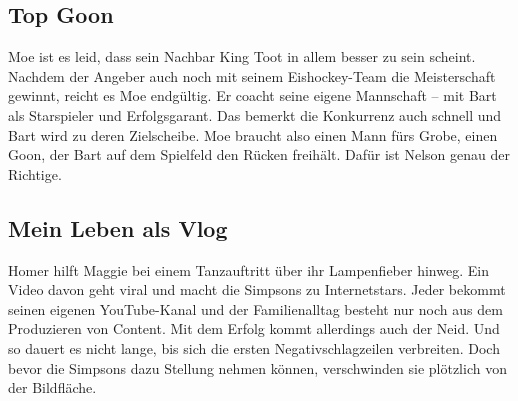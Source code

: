 
\subsection{Top Goon}
Moe ist es leid, dass sein Nachbar King Toot in allem besser zu sein scheint. Nachdem der Angeber auch noch mit seinem Eishockey-Team die Meisterschaft gewinnt, reicht es Moe endgültig. Er coacht seine eigene Mannschaft -- mit Bart als Starspieler und Erfolgsgarant. Das bemerkt die Konkurrenz auch schnell und Bart wird zu deren Zielscheibe. Moe braucht also einen Mann fürs Grobe, einen \glqq Goon\grqq, der Bart auf dem Spielfeld den Rücken freihält. Dafür ist Nelson genau der Richtige.


\subsection{Mein Leben als Vlog}
Homer hilft Maggie bei einem Tanzauftritt über ihr Lampenfieber hinweg. Ein Video davon geht viral und macht die Simpsons zu Internetstars. Jeder bekommt seinen eigenen YouTube-Kanal und der Familienalltag besteht nur noch aus dem Produzieren von Content. Mit dem Erfolg kommt allerdings auch der Neid. Und so dauert es nicht lange, bis sich die ersten Negativschlagzeilen verbreiten. Doch bevor die Simpsons dazu Stellung nehmen können, verschwinden sie plötzlich von der Bildfläche.


